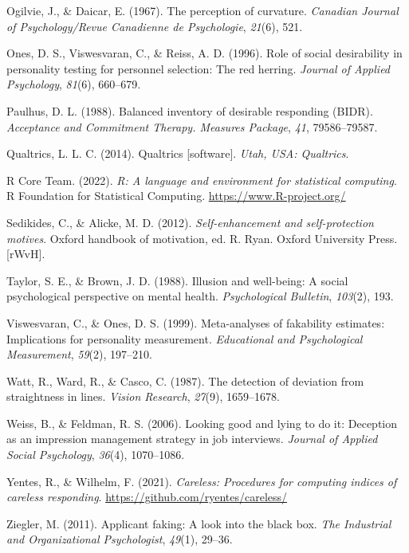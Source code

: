 \documentclass[
  ,jou]{apa6}
\newlength{\cslhangindent}
\newenvironment{CSLReferences}[2] %
 {\begin{list}{}{%
  \setlength{\itemindent}{0pt}
  \setlength{\leftmargin}{0pt}
  \setlength{\parsep}{0pt}
  \ifodd #1
   \setlength{\leftmargin}{\cslhangindent}
   \setlength{\itemindent}{-1\cslhangindent}
  \fi
  \setlength{\itemsep}{#2\baselineskip}}}
 {\end{list}}
\begin{document}
\begin{CSLReferences}{1}{0}
Ogilvie, J., \& Daicar, E. (1967). The perception of curvature. \emph{Canadian Journal of Psychology/Revue Canadienne de Psychologie}, \emph{21}(6), 521.

Ones, D. S., Viswesvaran, C., \& Reiss, A. D. (1996). Role of social desirability in personality testing for personnel selection: The red herring. \emph{Journal of Applied Psychology}, \emph{81}(6), 660--679.

Paulhus, D. L. (1988). Balanced inventory of desirable responding ({BIDR}). \emph{Acceptance and Commitment Therapy. Measures Package}, \emph{41}, 79586--79587.

Qualtrics, L. L. C. (2014). Qualtrics {[}software{]}. \emph{Utah, {USA}: Qualtrics}.

R Core Team. (2022). \emph{R: A language and environment for statistical computing}. R Foundation for Statistical Computing. \url{https://www.R-project.org/}

Sedikides, C., \& Alicke, M. D. (2012). \emph{Self-enhancement and self-protection motives}. Oxford handbook of motivation, ed. R. Ryan. Oxford University Press.{[}{rWvH}{]}.

Taylor, S. E., \& Brown, J. D. (1988). Illusion and well-being: A social psychological perspective on mental health. \emph{Psychological Bulletin}, \emph{103}(2), 193.

Viswesvaran, C., \& Ones, D. S. (1999). Meta-analyses of fakability estimates: Implications for personality measurement. \emph{Educational and Psychological Measurement}, \emph{59}(2), 197--210.

Watt, R., Ward, R., \& Casco, C. (1987). The detection of deviation from straightness in lines. \emph{Vision Research}, \emph{27}(9), 1659--1678.

Weiss, B., \& Feldman, R. S. (2006). Looking good and lying to do it: Deception as an impression management strategy in job interviews. \emph{Journal of Applied Social Psychology}, \emph{36}(4), 1070--1086.

Yentes, R., \& Wilhelm, F. (2021). \emph{Careless: Procedures for computing indices of careless responding}. \url{https://github.com/ryentes/careless/}

Ziegler, M. (2011). Applicant faking: A look into the black box. \emph{The Industrial and Organizational Psychologist}, \emph{49}(1), 29--36.

\end{CSLReferences}

\endgroup
\end{document}
